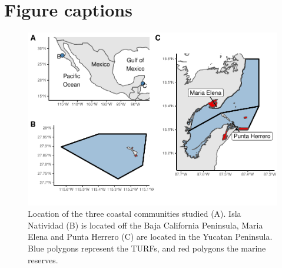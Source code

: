 \documentclass{frontiersSCNS}
\begin{document}
\clearpage




\clearpage

\section*{Figure captions}

\begin{figure}
\centering
\includegraphics{manuscript_files/figure-latex/unnamed-chunk-7-1.pdf}
\caption{\label{fig:unnamed-chunk-7}\label{fig:map}Location of the three
coastal communities studied (A). Isla Natividad (B) is located off the
Baja California Peninsula, Maria Elena and Punta Herrero (C) are located
in the Yucatan Peninsula. Blue polygons represent the TURFs, and red
polygons the marine reserves.}
\end{figure}
\end{document}

